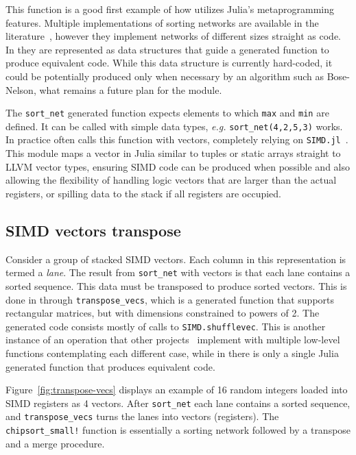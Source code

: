 \documentclass{juliacon}
\begin{document}
This function is a good first example of how \chipsort utilizes Julia's metaprogramming features. Multiple implementations of sorting networks are available in the literature~\cite{DBLP:journals/pvldb/ChhuganiNLMHCBKD08,sortingnetworksjl,ultrasort}, however they implement networks of different sizes straight as code. In \chipsort they are represented as data structures that guide a generated function to produce equivalent code. While this data structure is currently hard-coded, it could be potentially produced only when necessary by an algorithm such as Bose-Nelson, what remains a future plan for the module.

The {\tt sort\_net} generated function expects elements to which {\tt max} and {\tt min} are defined. It can be called with simple data types, {\em e.g.} {\tt sort\_net(4,2,5,3)} works. In practice \chipsort often calls this function with vectors, completely relying on {\tt SIMD.jl}~\cite{erik_schnetter_2019_2592633}. This module maps a vector in Julia similar to tuples or static arrays straight to LLVM vector types, ensuring SIMD code can be produced when possible and also allowing the flexibility of handling logic vectors that are larger than the actual registers, or spilling data to the stack if all registers are occupied.

\subsection{SIMD vectors transpose}
%
Consider a group of stacked SIMD vectors. Each column in this representation is termed a {\em lane}. The result from {\tt sort\_net} with vectors is that each lane contains a sorted sequence. This data must be transposed to produce sorted vectors. This is done in \chipsort through {\tt transpose\_vecs}, which is a generated function that supports rectangular matrices, but with dimensions constrained to powers of 2. The generated code consists mostly of calls to {\tt SIMD.shufflevec}. This is another instance of an operation that other projects~\cite{DBLP:journals/pvldb/BalkesenATO13,ultrasort} implement with multiple low-level functions contemplating each different case, while in \chipsort there is only a single Julia generated function that produces equivalent code.

Figure~\ref{fig:transpose-vecs} displays an example of 16 random integers loaded into SIMD registers as 4 vectors. After {\tt sort\_net} each lane contains a sorted sequence, and {\tt transpose\_vecs} turns the lanes into vectors (registers). The {\tt chipsort\_small!} function is essentially a sorting network followed by a transpose and a merge procedure.
\end{document}
